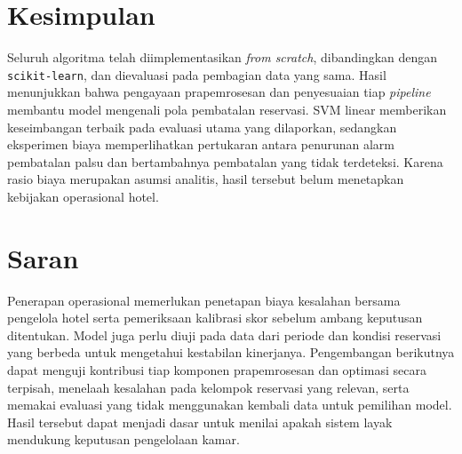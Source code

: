 \section{Kesimpulan}

Seluruh algoritma telah diimplementasikan \textit{from scratch}, dibandingkan dengan \texttt{scikit-learn}, dan dievaluasi pada pembagian data yang sama. Hasil menunjukkan bahwa pengayaan prapemrosesan dan penyesuaian tiap \textit{pipeline} membantu model mengenali pola pembatalan reservasi. SVM linear memberikan keseimbangan terbaik pada evaluasi utama yang dilaporkan, sedangkan eksperimen biaya memperlihatkan pertukaran antara penurunan alarm pembatalan palsu dan bertambahnya pembatalan yang tidak terdeteksi. Karena rasio biaya merupakan asumsi analitis, hasil tersebut belum menetapkan kebijakan operasional hotel.

\section{Saran}

Penerapan operasional memerlukan penetapan biaya kesalahan bersama pengelola hotel serta pemeriksaan kalibrasi skor sebelum ambang keputusan ditentukan. Model juga perlu diuji pada data dari periode dan kondisi reservasi yang berbeda untuk mengetahui kestabilan kinerjanya. Pengembangan berikutnya dapat menguji kontribusi tiap komponen prapemrosesan dan optimasi secara terpisah, menelaah kesalahan pada kelompok reservasi yang relevan, serta memakai evaluasi yang tidak menggunakan kembali data untuk pemilihan model. Hasil tersebut dapat menjadi dasar untuk menilai apakah sistem layak mendukung keputusan pengelolaan kamar.
